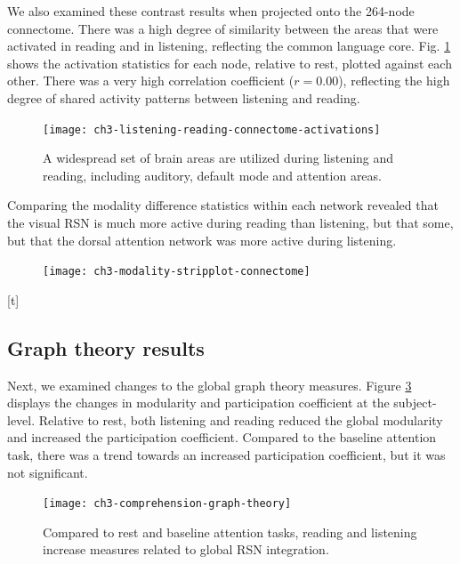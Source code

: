 We also examined these contrast results when projected onto the 264-node connectome. There was a high degree of similarity between the areas that were activated in reading and in listening, reflecting the common language core. Fig. \ref{fig:ch3-listening-reading-connectome-activations} shows the activation statistics for each node, relative to rest, plotted against each other. There was a very high correlation coefficient ($r = 0.00$), reflecting the high degree of shared activity patterns between listening and reading.

\begin{figure}[t]
	\centering
	\texttt{[image: ch3-listening-reading-connectome-activations]}
    \caption[There is significant overlap between the areas used in listening and reading.]{A widespread set of brain areas are utilized during listening and reading, including auditory, default mode and attention areas.}
	\label{fig:ch3-listening-reading-connectome-activations}
\end{figure}

Comparing the modality difference statistics within each network revealed that the visual RSN is much more active during reading than listening, but that some, but that the dorsal attention network was more active during listening.

\begin{figure}[t]
	\centering
	\texttt{[image: ch3-modality-stripplot-connectome]}
	\caption[Modality differences show RSN-level trends.]{}
	\label{fig:ch3-modality-stripplot-connectome}
\end{figure}[t]


\subsection{Graph theory results}

Next, we examined changes to the global graph theory measures. Figure \ref{fig:ch3-comprehension-graph-theory} displays the changes in modularity and participation coefficient at the subject-level. Relative to rest, both listening and reading reduced the global modularity and increased the participation coefficient. Compared to the baseline attention task, there was  a trend towards an increased participation coefficient, but it was not significant. 

\begin{figure}[t]
	\centering
	\texttt{[image: ch3-comprehension-graph-theory]}
    \caption[Language induces more integrated global network architecture.]{Compared to rest and baseline attention tasks, reading and listening increase measures related to global RSN integration.}
	\label{fig:ch3-comprehension-graph-theory}
\end{figure}


